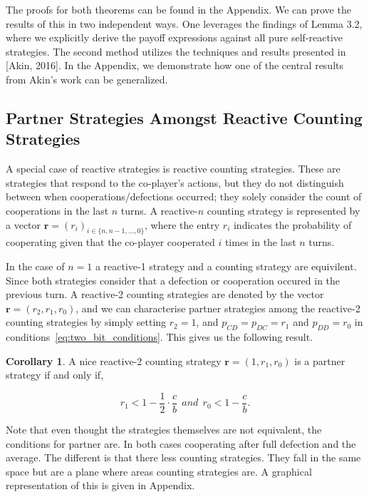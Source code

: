 \documentclass{article}
\theoremstyle{definition}
\newtheorem{corollary}{Corollary}[theorem]
\begin{document}
The proofs for both theorems can be found in the Appendix. We can prove the
results of this in two independent ways. One leverages the findings of Lemma
3.2, where we explicitly derive the payoff expressions against all pure
self-reactive strategies. The second method utilizes the techniques and results
presented in [Akin, 2016]. In the Appendix, we demonstrate how one of the
central results from Akin's work can be generalized.


\subsection{Partner Strategies Amongst Reactive Counting Strategies}

A special case of reactive strategies is reactive counting strategies. These are
strategies that respond to the co-player's actions, but they do not distinguish
between when cooperations/defections occurred; they solely consider the count of
cooperations in the last $n$ turns. A reactive-$n$ counting strategy is represented
by a vector $\mathbf{r}=(r_i)_{i \in \{n, n -1, \dots, 0\}}$, where the entry \(r_i\)
indicates the probability of cooperating given that the co-player cooperated
\(i\) times in the last \(n\) turns.

In the case of $n=1$ a reactive-1 strategy and a counting strategy are
equivilent. Since both strategies consider that a defection or cooperation
occured in the previous turn. A reactive-2 counting strategies are denoted by
the vector $\mathbf{r}=(r_2, r_1, r_0)$, and we can characterise partner
strategies among the reactive-2 counting strategies by simply setting $r_2 = 1$,
and $p_{CD} = p_{DC} = r_1$ and $p_{DD} = r_0$ in
conditions~\eqref{eq:two_bit_conditions}. This gives us the following result.

\begin{corollary}
A nice reactive-2 counting strategy $\mathbf{r} = (1, r_1, r_0)$ is a partner strategy if and only if,

\begin{equation}\label{eq:counting_two_bit_conditions}
  \displaystyle r_1 < 1-\frac{1}{2} \cdot \frac{c}{b} ~~and~~ r_0 < 1\!-\! \frac{c}{b}.
\end{equation}
\end{corollary}

Note that even thought the strategies themselves are not equivalent, the
conditions for partner are. In both cases cooperating after full defection and
the average. The different is that there less counting strategies. They fall in
the same space but are a plane where areas counting strategies are. A graphical
representation of this is given in Appendix.
\end{document}
